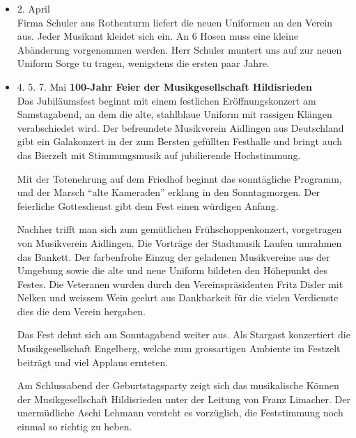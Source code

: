 \begin{history}
\begin{itemize}
        \item 2. April\\
              Firma Schuler aus Rothenturm liefert die neuen Uniformen an den Verein
              aus. Jeder Musikant kleidet sich ein. An 6 Hosen muss eine kleine
              Abänderung vorgenommen werden. Herr Schuler muntert uns auf zur neuen
              Uniform Sorge tu tragen, wenigstens die ersten paar Jahre.

        \item 4. 5. 7. Mai \textbf{100-Jahr Feier der Musikgesellschaft
                  Hildisrieden}\\
              Das Jubiläumsfest beginnt mit einem festlichen Eröffnungskonzert am
              Samstagabend, an dem die alte, stahlblaue Uniform mit rassigen Klängen
              verabschiedet wird. Der befreundete Musikverein Aidlingen aus
              Deutschland gibt ein Galakonzert in der zum Bersten gefüllten Festhalle
              und bringt auch  das Bierzelt mit Stimmungsmusik auf jubilierende
              Hochstimmung.

              Mit der Totenehrung auf dem Friedhof beginnt das sonntägliche Programm,
              und der Marsch \enquote{alte Kameraden} erklang in den Sonntagmorgen.
              Der feierliche Gottesdienst gibt dem Fest einen würdigen Anfang.

              Nachher trifft man sich zum gemütlichen Frühschoppenkonzert, vorgetragen
              von Musikverein Aidlingen. Die Vorträge der Stadtmusik Laufen umrahmen
              das Bankett. Der farbenfrohe Einzug der geladenen Musikvereine aus der
              Umgebung sowie die alte und neue Uniform bildeten den Höhepunkt des
              Festes. Die Veteranen wurden durch den Vereinspräsidenten Fritz Disler
              mit Nelken und weissem Wein geehrt aus Dankbarkeit für die vielen
              Verdienste dies die dem Verein hergaben.

              Das Fest dehnt sich am Sonntagabend weiter aus. Als Stargast konzertiert
              die Musikgesellschaft Engelberg, welche zum grossartigen Ambiente im
              Festzelt beiträgt und viel Applaus ernteten.

              Am Schlussabend der Geburtstagsparty zeigt sich das musikalische Können
              der Musikgesellschaft Hildisrieden unter der Leitung von Franz Limacher.
              Der unermüdliche Aschi Lehmann versteht es vorzüglich, die Feststimmung
              noch einmal so richtig zu heben.


\end{itemize}
\end{history}
